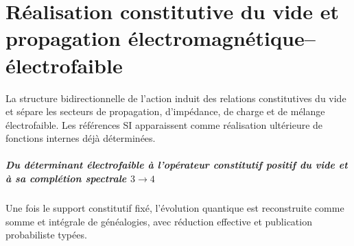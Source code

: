 \chapter{Réalisation constitutive du vide et propagation électromagnétique–électrofaible}
\label{chap:parte-iv-52}

La structure bidirectionnelle de l’action induit des relations constitutives du vide et sépare les secteurs de propagation, d’impédance, de charge et de mélange électrofaible. Les références SI apparaissent comme réalisation ultérieure de fonctions internes déjà déterminées.





\paragraph{Du déterminant électrofaible à l’opérateur constitutif positif du vide et à sa complétion spectrale \(3\to4\)} Une fois le support constitutif fixé, l’évolution quantique est reconstruite comme somme et intégrale de généalogies, avec réduction effective et publication probabiliste typées.
